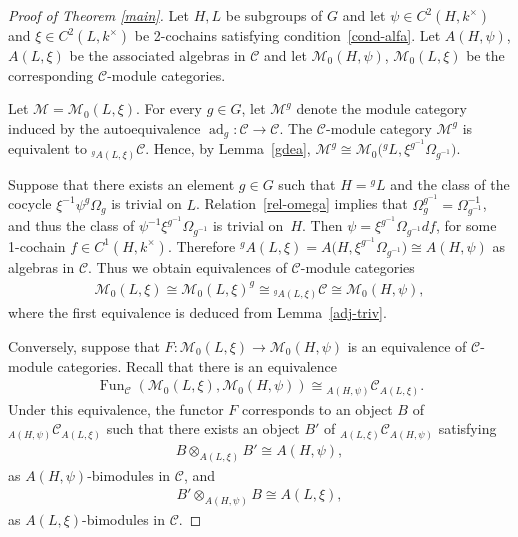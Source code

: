 \documentclass[pdftex]{sigma}
\numberwithin{equation}{section}
\newcommand{\cch}{\Omega}
\newcommand{\C}{{\mathcal C}}
\newcommand{\M}{{\mathcal M}}
\newcommand{\1}{\textbf{1}}
\newcommand\ad{\operatorname{ad}}
\newcommand\Fun{\operatorname{Fun}}
\begin{document}
\begin{proof}[Proof of Theorem \ref{main}] Let $H, L$ be subgroups of $G$ and let $\psi \in C^2(H, k^{\times})$ and $\xi \in C^2(L, k^{\times})$ be 2-cochains satisfying condition~\eqref{cond-alfa}. Let $A(H, \psi)$, $A(L, \xi)$ be the associated algebras in $\C$ and let $\M_0(H, \psi)$, $\M_0(L, \xi)$ be the corresponding $\C$-module categories.

Let $\M = \M_0(L, \xi)$. For every $g \in G$, let $\M^g$ denote the module category induced by the autoequivalence $\ad_g\colon \C \to \C$.
The $\C$-module category $\M^g$ is equivalent to $_{^gA(L, \xi)}\C$. Hence, by Lemma~\ref{gdea}, $\M^g \cong \M_0\big({}^gL, \xi^{g^{-1}} \cch_{g^{-1}}\big)$.

Suppose that there exists an element $g \in G$ such that $H = {}^gL$ and the class of the cocycle $\xi^{-1}\psi^g\cch_g$ is trivial on $L$. Relation~\eqref{rel-omega} implies that $\cch_g^{g^{-1}} = \cch_{g^{-1}}^{-1}$, and thus the class of $\psi^{-1}\xi^{g^{-1}}\cch_{g^{-1}}$ is trivial on~$H$. Then $\psi = \xi^{g^{-1}}\cch_{g^{-1}} df$, for some 1-cochain $f \in C^1(H, k^{\times})$. Therefore $^gA(L, \xi) = A\big(H, \xi^{g^{-1}} \cch_{g^{-1}}\big) \cong A(H, \psi)$ as algebras in $\C$. Thus we obtain equivalences of $\C$-module categories
\begin{gather*}\M_0(L, \xi) \cong \M_0(L, \xi)^g \cong {} _{^gA(L, \xi)}\C \cong \M_0(H, \psi),\end{gather*}
where the f\/irst equivalence is deduced from Lemma~\ref{adj-triv}.

Conversely, suppose that $F\colon \M_0(L, \xi) \to \M_0(H, \psi)$ is an equivalence of $\C$-module categories. Recall that there is an equivalence
\begin{gather*}\label{equiv-fun-1} \Fun_\C\left(\M_0(L, \xi), \M_0(H, \psi)\right) \cong {} _{A(H, \psi)}\C_{A(L, \xi)}.\end{gather*}
Under this equivalence, the functor $F$ corresponds to an object $B$ of $_{A(H, \psi)}\C_{A(L, \xi)}$ such that there exists an object $B'$ of $_{A(L, \xi)}\C_{A(H, \psi)}$ satisfying
\begin{gather}\label{dim-b}B \otimes_{A(L, \xi)}B' \cong A(H, \psi),\end{gather} as $A(H, \psi)$-bimodules in $\C$, and
\begin{gather}\label{bbprime}B' \otimes_{A(H, \psi)}B \cong A(L, \xi), \end{gather} as $A(L, \xi)$-bimodules in $\C$.


\end{proof}
\end{document}
